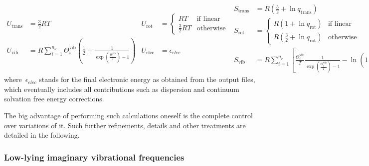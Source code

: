 \begin{subequations}
	\begin{align}
		U_\text{trans}
		 & = \frac{3}{2} R T
		 & U_\text{rot}
		 & = \begin{cases}
			     R T             & \text{if linear} \\
			     \frac{3}{2} R T & \text{otherwise}
		     \end{cases} \\
		U_\text{vib}
		 & = R \sum_{i = 1}^{n_\nu}
		\Theta^\text{vib}_i
		\left(
		\frac{1}{2}
		+ \frac{1}{
			\exp \left( \frac{\Theta^\text{vib}_i}{T}\right)
			- 1
		}
		\right)
		 & U_\text{elec}
		 & = \epsilon_{elec}
	\end{align}
	\begin{align}
		S_\text{trans}
		 & = R \left(
		\frac{5}{2}
		+ \ln{q_\text{trans}}
		\right)
		 & S_\text{elec}
		 & = R \ln{q_\text{elec}}                           \\
		S_\text{rot}
		 & = \begin{cases}
			     R \left(
			     1
			     + \ln{q_\text{rot}}
			     \right) & \text{if linear} \\
			     R \left(
			     \frac{3}{2}
			     + \ln{q_\text{rot}}
			     \right) & \text{otherwise}
		     \end{cases} \\
		S_\text{vib}
		 & = R \sum_{i = 1}^{n_\nu}
		\left[
			\frac{
				\Theta^\text{vib}_i
			}{T}
			\frac{1}{
				\exp \left( \frac{\Theta^\text{vib}_i}{T}\right)
				- 1
			}
			- \ln{\left(
				1
				- \exp \left( - \frac{\Theta^\text{vib}_i}{T}\right)
				\right)}
			\right]
	\end{align}
\end{subequations}
% 
where~$\epsilon_{elec}$ stands for the final electronic energy as obtained from the output files,
which eventually includes all contributions such as dispersion and continuum solvation free energy corrections.

The big advantage of performing such calculations oneself is the complete control over variations of it.
Such further refinements,
details and other treatments are detailed in the following.

\subsubsection{Low-lying imaginary vibrational frequencies}

